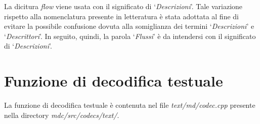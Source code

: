 \begin{notabene}
La dicitura \textit{flow} viene usata con il significato di
`\emph{Descrizioni}'. Tale variazione rispetto alla nomenclatura presente in
letteratura è stata adottata al fine di evitare la possibile confusione dovuta
alla somiglianza dei termini `\emph{Descrizioni}' e `\emph{Descrittori}'. In seguito, quindi, la parola `\emph{Flussi}' è da intendersi con il significato di `\emph{Descrizioni}'.
\end{notabene}

\section{Funzione di decodifica testuale}
\label{cap:decode}
La funzione di decodifica testuale è contenuta nel file
\textit{text/md/codec.cpp} presente nella directory
\textit{mdc/src/codecs/text/}.

